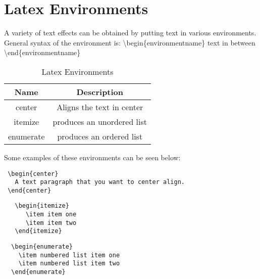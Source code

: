 \section{Latex Environments}
A variety of text effects can be obtained by putting text in various environments. General syntax of the environment is:
\textbackslash begin\{environmentname\} text in between  \textbackslash end\{environmentname\}
\begin{table}[h]
\centering
\begin{tabular}{c c}
 Name & Description  \\ \hline
 center & Aligns the text in center \\
 itemize & produces an unordered list \\ 
 enumerate & produces an ordered list \\
 
 \end{tabular}
\caption{Latex Environments}
\label{tab:environment}
\end{table}
Some examples of these environments can be seen below:
\begin{lstlisting}
 \begin{center}
   A text paragraph that you want to center align.
 \end{center}
\end{lstlisting}

\begin{lstlisting}
   \begin{itemize}
      \item item one
      \item item two
   \end{itemize}
\end{lstlisting}

\begin{lstlisting}
  \begin{enumerate}
    \item numbered list item one
    \item numbered list item two
  \end{enumerate}
\end{lstlisting}

